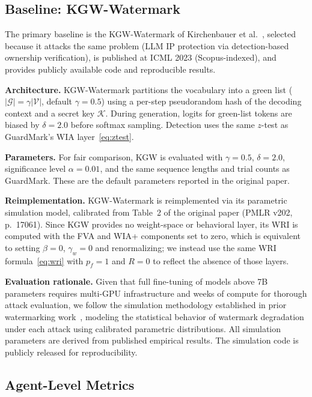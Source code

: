 \documentclass[journal,compsoc]{IEEEtran}
\newcommand{\K}{\mathcal{K}}
\begin{document}
\subsection{Baseline: KGW-Watermark}

The primary baseline is the KGW-Watermark of Kirchenbauer et
al.~\cite{kirchenbauer2023watermark}, selected because it attacks the same
problem (LLM IP protection via detection-based ownership verification), is
published at ICML 2023 (Scopus-indexed), and provides publicly available
code and reproducible results.

\textbf{Architecture.} KGW-Watermark partitions the vocabulary into a green
list ($|\mathcal{G}| = \gamma|\mathcal{V}|$, default $\gamma=0.5$) using a
per-step pseudorandom hash of the decoding context and a secret key $\K$.
During generation, logits for green-list tokens are biased by $\delta=2.0$
before softmax sampling. Detection uses the same $z$-test as GuardMark's WIA
layer~\eqref{eq:ztest}.

\textbf{Parameters.} For fair comparison, KGW is evaluated with $\gamma=0.5$,
$\delta=2.0$, significance level $\alpha=0.01$, and the same sequence lengths
and trial counts as GuardMark. These are the default parameters reported in the
original paper.

\textbf{Reimplementation.} KGW-Watermark is reimplemented via its parametric
simulation model, calibrated from Table~2 of the original paper (PMLR v202,
p.~17061). Since KGW provides no weight-space or behavioral layer, its WRI
is computed with the FVA and WIA+ components set to zero, which is equivalent
to setting $\beta=0$, $\gamma_w=0$ and renormalizing; we instead use the same
WRI formula~\eqref{eq:wri} with $p_f=1$ and $R=0$ to reflect the absence of
those layers.

\textbf{Evaluation rationale.} Given that full fine-tuning of models above 7B
parameters requires multi-GPU infrastructure and weeks of compute for thorough
attack evaluation, we follow the simulation methodology established in prior
watermarking work~\cite{kirchenbauer2023watermark,fernandez2023three}, modeling
the statistical behavior of watermark degradation under each attack using
calibrated parametric distributions. All simulation parameters are derived from
published empirical results. The simulation code is publicly released for
reproducibility.

\subsection{Agent-Level Metrics}
\end{document}
